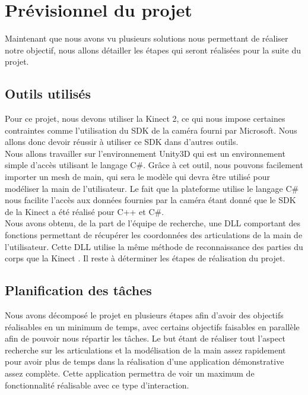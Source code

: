 \chapter{Prévisionnel du projet}
Maintenant que nous avons vu plusieurs solutions nous permettant de réaliser notre 
objectif, nous allons détailler les étapes qui seront réalisées pour la suite du projet.

\section{Outils utilisés}
Pour ce projet, nous devons utiliser la Kinect 2, ce qui nous impose certaines contraintes comme l'utilisation
du SDK de la caméra fourni par Microsoft. Nous allons donc devoir réussir à utiliser ce SDK dans d'autres outils.\\

Nous allons travailler sur l'environnement Unity3D qui est 
un environnement simple d'accès utilisant le langage C\#. Grâce à cet outil, nous pouvons
facilement importer un mesh de main, qui sera le modèle qui devra être utilisé pour modéliser
la main de l'utilisateur. Le fait que la plateforme utilise le langage C\# nous facilite 
l'accès aux données fournies par la caméra étant donné que le SDK de la Kinect a été réalisé pour
C++ et C\#.\\

Nous avons obtenu, de la part de l'équipe de recherche, une DLL comportant des fonctions permettant
de récupérer les coordonnées des articulations de la main de l'utilisateur. Cette DLL utilise 
la même méthode de reconnaissance des parties du corps que la Kinect \cite{export:145347}. Il reste à déterminer les 
étapes de réalisation du projet.

\section{Planification des tâches}
Nous avons décomposé le projet en plusieurs étapes afin d'avoir des objectifs réalisables en 
un minimum de temps, avec certains objectifs faisables en parallèle afin de pouvoir nous répartir
les tâches. Le but étant de réaliser tout l'aspect recherche sur les articulations et la modélisation de la main assez rapidement pour 
avoir plus de temps dans la réalisation d'une application démonstrative assez complète. Cette application
permettra de voir un maximum de fonctionnalité réalisable avec ce type d'interaction.\\

